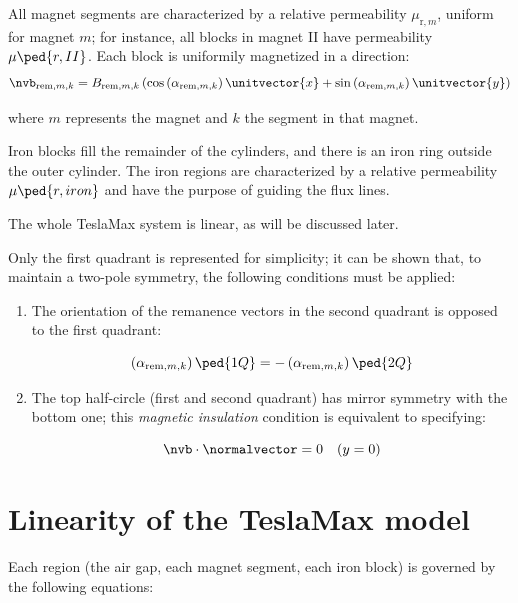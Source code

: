 \documentclass[article,brazil,english]{techreport}
\newcommand{\teslamax}{TeslaMax{ }}
\newcommand{\murm}{\mu_{\mathrm{r},m}}
\newcommand{\indexremmk}{\mathrm{rem},m,k}
\newcommand{\nvbremmk}{\nvb_{\indexremmk}}
\newcommand{\bremmk}{B_{\indexremmk}}
\newcommand{\alpharemmk}{\alpha_{\indexremmk}}
\begin{document}
All magnet segments are characterized by a relative permeability $\murm$, uniform for magnet $m$; for instance, all blocks in magnet II have permeability $\mu\ped{r,II}$. Each block is uniformily magnetized in a direction:
\begin{equation}
  \label{eq:1}
\nvbremmk = \bremmk \left( \cos\left( \alpharemmk \right) \unitvector{x} + \sin\left( \alpharemmk \right) \unitvector{y} \right)
\end{equation}

\noindent where $m$ represents the magnet and $k$ the segment in that magnet.


Iron blocks fill the remainder of the cylinders, and there is an iron ring outside the outer cylinder. The iron regions are characterized by a relative permeability $\mu\ped{r,iron}$ and have the purpose of guiding the flux lines.

The whole \teslamax system is linear, as will be discussed later.

Only the first quadrant is represented for simplicity; it can be shown that, to maintain a two-pole symmetry, the following conditions must be applied:

\begin{enumerate}
\item The orientation of the remanence vectors in the second quadrant is opposed to the first quadrant:

  \begin{equation}
    \label{eq:2}
    \left( \alpharemmk \right)\ped{1Q} = -\left( \alpharemmk \right)\ped{2Q}
  \end{equation}
\item The top half-circle (first and second quadrant) has mirror symmetry with the bottom one; this \emph{magnetic insulation} condition is equivalent to specifying:

  \begin{equation}
    \label{eq:3}
    \nvb \cdot \normalvector = 0 \quad (y = 0)
  \end{equation}
\end{enumerate}

\section{Linearity of the \teslamax model}
\label{sec:line-tesl-model}

Each region (the air gap, each magnet segment, each iron block) is governed by the following equations:
\end{document}
